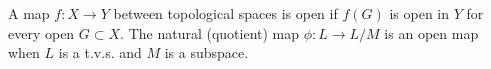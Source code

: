 A map $f: X \to Y$ between topological spaces is open if $f(G)$ is open in $Y$ for every open $G \subset X$. The natural (quotient) map $\phi: L \to L/M$ is an open map when $L$ is a t.v.s. and $M$ is a subspace.
